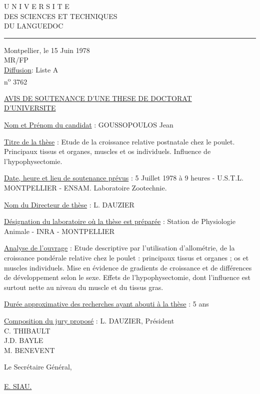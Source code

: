 
U N I V E R S I T E\\
DES SCIENCES ET TECHNIQUES\\
DU LANGUEDOC\\
\rule{3em}{0.4pt}

Montpellier, le 15 Juin 1978\\

MR/FP\\
\uline{Diffusion}: Liste A\\
n\textsuperscript{o} 3762

\uline{AVIS DE SOUTENANCE D'UNE THESE DE DOCTORAT}\\
\uline{D'UNIVERSITE}

\uline{Nom et Prénom du candidat} : GOUSSOPOULOS Jean

\uline{Titre de la thèse} : Etude de la croissance relative postnatale chez le poulet. Principaux tissus et organes, muscles et os individuels. Influence de l'hypophysectomie.

\uline{Date, heure et lieu de soutenance prévus} : 5 Juillet 1978 à 9 heures - U.S.T.L. MONTPELLIER - ENSAM. Laboratoire Zootechnie.

\uline{Nom du Directeur de thèse} : L. DAUZIER

\uline{Désignation du laboratoire où la thèse est préparée} : Station de Physiologie Animale - INRA - MONTPELLIER

\uline{Analyse de l'ouvrage} : Etude descriptive par l'utilisation d'allométrie, de la croissance pondérale relative chez le poulet : principaux tissus et organes ; os et muscles individuels. Mise en évidence de gradients de croissance et de différences de développement selon le sexe. Effets de l'hypophysectomie, dont l'influence est surtout nette au niveau du muscle et du tissus gras.

\uline{Durée approximative des recherches ayant abouti à la thèse} : 5 ans

\uline{Composition du jury proposé} : \quad L. DAUZIER, Président\\
\hspace*{12em}C. THIBAULT\\
\hspace*{12em}J.D. BAYLE\\
\hspace*{12em}M. BENEVENT

Le Secrétaire Général,\\

\\

\uline{E. SIAU.}

